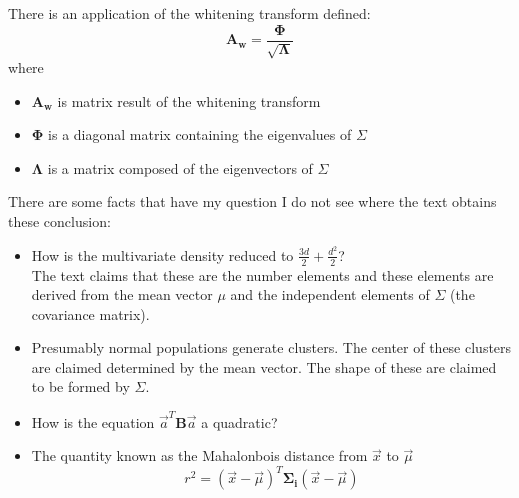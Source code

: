 \documentclass[11pt]{article}
\begin{document}
There is an application of the whitening transform defined:
\begin{equation}
	\mathbf{A_{w}}  = \frac{\mathbf{\Phi} }{\sqrt{\mathbf{\Lambda}}}
\end{equation}
where 
\begin{itemize}
	\item $\mathbf{A_{w}}$ is matrix result of the whitening transform
	\item $\mathbf{\Phi}$ is a diagonal matrix containing the eigenvalues of $\Sigma$
	\item $\mathbf{\Lambda}$ is a matrix composed of the eigenvectors of $\Sigma$
\end{itemize}


There are some facts that have my question I do not see where the text obtains these conclusion:
\begin{itemize}
	\item How is the multivariate density reduced to $\frac{3d}{2}+ \frac{d^2}{2}$? \\
	The text claims that these are the number elements and these elements are derived from the mean vector $\mu$ and the independent elements of $\Sigma$ (the covariance matrix).  
	\item Presumably normal populations generate clusters.  The center of these clusters are claimed determined by the mean vector.  The shape of these are claimed to be formed by $\Sigma$.   
	\item How is the equation $\vec{a}^T \mathbf{B} \vec{a}$ a quadratic?  
	\item The quantity known as the Mahalonbois distance from $\vec{x}$ to $\vec{\mu}$
	\[
		r^2 = (\vec{x} - \vec{\mu})^T \mathbf{\Sigma_i} (\vec{x} - \vec{\mu})
	\]
\end{itemize}
\end{document}
